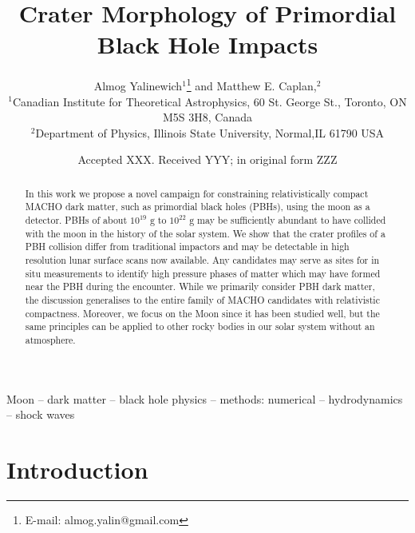 \documentclass[usenatbib]{mnras}
\title[PBH lunar craters]{Crater Morphology of Primordial Black Hole Impacts}
\author[A. Yalinewich and M. Caplan]{
Almog Yalinewich$^{1}$\thanks{E-mail: almog.yalin@gmail.com}
and Matthew E. Caplan,$^{2}$
\\
$^{1}$Canadian Institute for Theoretical Astrophysics, 60 St. George St., Toronto, ON M5S 3H8, Canada\\
$^{2}$Department of Physics, Illinois State University, Normal,IL 61790 USA
}
\date{Accepted XXX. Received YYY; in original form ZZZ}
\begin{document}
\label{firstpage}
\pagerange{\pageref{firstpage}--\pageref{lastpage}}
\maketitle

\begin{abstract}
In this work we propose a novel campaign for constraining relativistically compact MACHO dark matter, such as primordial black holes (PBHs), using the moon as a detector. PBHs of about $10^{19} \textrm{ g}$ to $10^{22} \textrm{ g}$ may be sufficiently abundant to have collided with the moon in the history of the solar system. 
We show that the crater profiles of a PBH collision differ from traditional impactors and may be detectable in high resolution lunar surface scans now available. Any candidates may serve as sites for in situ measurements to identify high pressure phases of matter which may have formed near the PBH during the encounter.  
While we primarily consider PBH dark matter, the discussion generalises to the entire family of MACHO candidates with relativistic compactness. Moreover, we focus on the Moon since it has been studied well, but the same principles can be applied to other rocky bodies in our solar system without an atmosphere.

\end{abstract}

\begin{keywords}
Moon -- dark matter -- black hole physics -- methods: numerical -- hydrodynamics -- shock waves
\end{keywords}



\section{Introduction}
\end{document}
